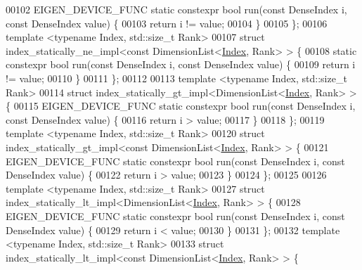 \begin{DoxyCode}
00102   EIGEN\_DEVICE\_FUNC \textcolor{keyword}{static} constexpr \textcolor{keywordtype}{bool} run(\textcolor{keyword}{const} DenseIndex i, \textcolor{keyword}{const} DenseIndex value) \{
00103     \textcolor{keywordflow}{return} i != value;
00104   \}
00105 \};
00106 \textcolor{keyword}{template} <\textcolor{keyword}{typename} Index, std::\textcolor{keywordtype}{size\_t} Rank>
00107 \textcolor{keyword}{struct }index\_statically\_ne\_impl<const DimensionList<\hyperlink{namespace_eigen_a62e77e0933482dafde8fe197d9a2cfde}{Index}, Rank> > \{
00108   \textcolor{keyword}{static} constexpr \textcolor{keywordtype}{bool} run(\textcolor{keyword}{const} DenseIndex i, \textcolor{keyword}{const} DenseIndex value) \{
00109     \textcolor{keywordflow}{return} i != value;
00110   \}
00111 \};
00112 
00113 \textcolor{keyword}{template} <\textcolor{keyword}{typename} Index, std::\textcolor{keywordtype}{size\_t} Rank>
00114 \textcolor{keyword}{struct }index\_statically\_gt\_impl<DimensionList<\hyperlink{namespace_eigen_a62e77e0933482dafde8fe197d9a2cfde}{Index}, Rank> > \{
00115   EIGEN\_DEVICE\_FUNC \textcolor{keyword}{static} constexpr \textcolor{keywordtype}{bool} run(\textcolor{keyword}{const} DenseIndex i, \textcolor{keyword}{const} DenseIndex value) \{
00116     \textcolor{keywordflow}{return} i > value;
00117   \}
00118 \};
00119 \textcolor{keyword}{template} <\textcolor{keyword}{typename} Index, std::\textcolor{keywordtype}{size\_t} Rank>
00120 \textcolor{keyword}{struct }index\_statically\_gt\_impl<const DimensionList<\hyperlink{namespace_eigen_a62e77e0933482dafde8fe197d9a2cfde}{Index}, Rank> > \{
00121   EIGEN\_DEVICE\_FUNC \textcolor{keyword}{static} constexpr \textcolor{keywordtype}{bool} run(\textcolor{keyword}{const} DenseIndex i, \textcolor{keyword}{const} DenseIndex value) \{
00122     \textcolor{keywordflow}{return} i > value;
00123   \}
00124 \};
00125 
00126 \textcolor{keyword}{template} <\textcolor{keyword}{typename} Index, std::\textcolor{keywordtype}{size\_t} Rank>
00127 \textcolor{keyword}{struct }index\_statically\_lt\_impl<DimensionList<\hyperlink{namespace_eigen_a62e77e0933482dafde8fe197d9a2cfde}{Index}, Rank> > \{
00128   EIGEN\_DEVICE\_FUNC \textcolor{keyword}{static} constexpr \textcolor{keywordtype}{bool} run(\textcolor{keyword}{const} DenseIndex i, \textcolor{keyword}{const} DenseIndex value) \{
00129     \textcolor{keywordflow}{return} i < value;
00130   \}
00131 \};
00132 \textcolor{keyword}{template} <\textcolor{keyword}{typename} Index, std::\textcolor{keywordtype}{size\_t} Rank>
00133 \textcolor{keyword}{struct }index\_statically\_lt\_impl<const DimensionList<\hyperlink{namespace_eigen_a62e77e0933482dafde8fe197d9a2cfde}{Index}, Rank> > \{

\end{DoxyCode}
